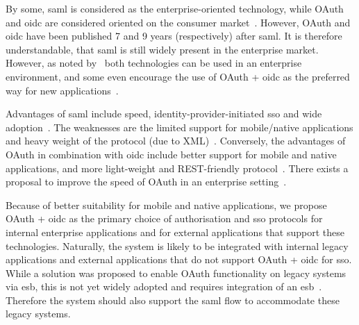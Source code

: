 By some, \acrshort{saml} is considered as the enterprise-oriented technology, while OAuth and \acrshort{oidc} are considered oriented on the consumer market~\cite{Fagbemi2016ComparingWS-Federation, SoftwareSecured2016Differentiating2, OneLoginInc.SAMLOAuth}. However, OAuth and \acrshort{oidc} have been published 7 and 9 years  (respectively) after \acrshort{saml}. It is therefore understandable, that \acrshort{saml} is still widely present in the enterprise market. However, as noted by~\cite{Naik2017SecuringConnect} both technologies can be used in an enterprise environment, and some even encourage the use of OAuth + \acrshort{oidc} as the preferred way for new applications~\cite{barbkess2019SingleDirectory}.

Advantages of \acrshort{saml} include speed, identity-provider-initiated \acrshort{sso} and wide adoption~\cite{OneLoginInc.SAMLOAuth, Naik2017SecuringConnect}. The weaknesses are the limited support for mobile/native applications and heavy weight of the protocol (due to XML)~\cite{Naik2017SecuringConnect}. Conversely, the advantages of OAuth in combination with \acrshort{oidc} include better support for mobile and native applications, and more light-weight and REST-friendly protocol~\cite{Naik2017SecuringConnect}. There exists a proposal to improve the speed of OAuth in an enterprise setting~\cite{Noureddine2011AEnterprise}.

Because of better suitability for mobile and native applications, we propose OAuth + \acrshort{oidc} as the primary choice of authorisation and \acrshort{sso} protocols for internal enterprise applications and for external applications that support these technologies. Naturally, the system is likely to be integrated with internal legacy applications and external applications that do not support OAuth + \acrshort{oidc} for \acrshort{sso}. While a solution was proposed to enable OAuth functionality on legacy systems via \acrfull{esb}, this is not yet widely adopted and requires integration of an \acrshort{esb}~\cite{deSousaRibeiro2018AnBus}. Therefore the system should also support the \acrshort{saml} flow to accommodate these legacy systems.



